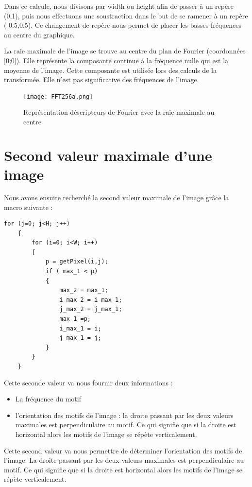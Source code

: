\documentclass[a4paper,11pt]{article}
\begin{document}
  Dans ce calcule, nous divisons par width ou height afin de passer à un repère (0,1), puis nous effectuons une 
  soustraction dans le but de se ramener à un repère (-0.5,0.5). Ce changement de repère nous permet de placer
  les basses fréquences au centre du graphique.
  
  La raie maximale de l'image se trouve au centre du plan de Fourier (coordonnées [0;0]). Elle représente la 
  composante continue à la fréquence nulle qui est la moyenne de l'image. Cette composante est utilisée lors des
  calculs de la transformée. Elle n'est pas significative des fréquences de l'image.
  
  \begin{figure}[H]
  \center
   \texttt{[image: FFT256a.png]}
   \caption{Représentation déscripteurs de Fourier avec la raie maximale au centre}
  \end{figure}

  
  \section{Second valeur maximale d'une image}
  
  Nous avons ensuite recherché la second valeur maximale de l'image grâce la macro suivante :
  \begin{lstlisting}[caption=Fonctions de passage aux coordonnées dans le plan de Fourier]
  for (j=0; j<H; j++)
    {
        for (i=0; i<W; i++) 
        {
            p = getPixel(i,j);
            if ( max_1 < p)
            {
                max_2 = max_1;
                i_max_2 = i_max_1;
                j_max_2 = j_max_1;
                max_1 =p;
                i_max_1 = i;
                j_max_1 = j;
            } 
        }
    }
  \end{lstlisting}
  
  Cette seconde valeur va nous fournir deux informations :
  \begin{itemize}
   \item La fréquence du motif
   \item l'orientation des motifs de l'image : la droite passant
  par les deux valeurs maximales est perpendiculaire au motif. Ce qui signifie que si la droite est horizontal
  alors les motifs de l'image se répète verticalement.
  \end{itemize}

  Cette second valeur va nous permettre de déterminer l'orientation des motifs de l'image. La droite passant
  par les deux valeurs maximales est perpendiculaire au motif. Ce qui signifie que si la droite est horizontal
  alors les motifs de l'image se répète verticalement.
  
\end{document}
